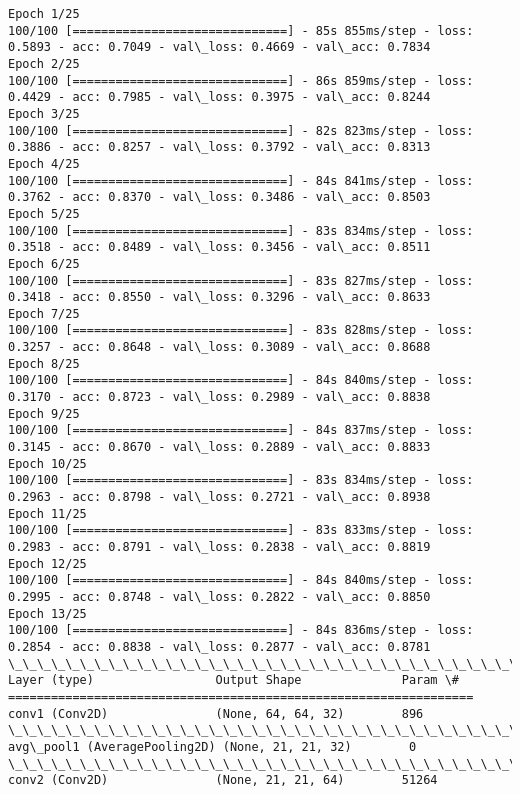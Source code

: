 \documentclass[11pt]{article}
\begin{document}
    \begin{Verbatim}[commandchars=\\\{\}]
Epoch 1/25
100/100 [==============================] - 85s 855ms/step - loss: 0.5893 - acc: 0.7049 - val\_loss: 0.4669 - val\_acc: 0.7834
Epoch 2/25
100/100 [==============================] - 86s 859ms/step - loss: 0.4429 - acc: 0.7985 - val\_loss: 0.3975 - val\_acc: 0.8244
Epoch 3/25
100/100 [==============================] - 82s 823ms/step - loss: 0.3886 - acc: 0.8257 - val\_loss: 0.3792 - val\_acc: 0.8313
Epoch 4/25
100/100 [==============================] - 84s 841ms/step - loss: 0.3762 - acc: 0.8370 - val\_loss: 0.3486 - val\_acc: 0.8503
Epoch 5/25
100/100 [==============================] - 83s 834ms/step - loss: 0.3518 - acc: 0.8489 - val\_loss: 0.3456 - val\_acc: 0.8511
Epoch 6/25
100/100 [==============================] - 83s 827ms/step - loss: 0.3418 - acc: 0.8550 - val\_loss: 0.3296 - val\_acc: 0.8633
Epoch 7/25
100/100 [==============================] - 83s 828ms/step - loss: 0.3257 - acc: 0.8648 - val\_loss: 0.3089 - val\_acc: 0.8688
Epoch 8/25
100/100 [==============================] - 84s 840ms/step - loss: 0.3170 - acc: 0.8723 - val\_loss: 0.2989 - val\_acc: 0.8838
Epoch 9/25
100/100 [==============================] - 84s 837ms/step - loss: 0.3145 - acc: 0.8670 - val\_loss: 0.2889 - val\_acc: 0.8833
Epoch 10/25
100/100 [==============================] - 83s 834ms/step - loss: 0.2963 - acc: 0.8798 - val\_loss: 0.2721 - val\_acc: 0.8938
Epoch 11/25
100/100 [==============================] - 83s 833ms/step - loss: 0.2983 - acc: 0.8791 - val\_loss: 0.2838 - val\_acc: 0.8819
Epoch 12/25
100/100 [==============================] - 84s 840ms/step - loss: 0.2995 - acc: 0.8748 - val\_loss: 0.2822 - val\_acc: 0.8850
Epoch 13/25
100/100 [==============================] - 84s 836ms/step - loss: 0.2854 - acc: 0.8838 - val\_loss: 0.2877 - val\_acc: 0.8781
\_\_\_\_\_\_\_\_\_\_\_\_\_\_\_\_\_\_\_\_\_\_\_\_\_\_\_\_\_\_\_\_\_\_\_\_\_\_\_\_\_\_\_\_\_\_\_\_\_\_\_\_\_\_\_\_\_\_\_\_\_\_\_\_\_
Layer (type)                 Output Shape              Param \#   
=================================================================
conv1 (Conv2D)               (None, 64, 64, 32)        896       
\_\_\_\_\_\_\_\_\_\_\_\_\_\_\_\_\_\_\_\_\_\_\_\_\_\_\_\_\_\_\_\_\_\_\_\_\_\_\_\_\_\_\_\_\_\_\_\_\_\_\_\_\_\_\_\_\_\_\_\_\_\_\_\_\_
avg\_pool1 (AveragePooling2D) (None, 21, 21, 32)        0         
\_\_\_\_\_\_\_\_\_\_\_\_\_\_\_\_\_\_\_\_\_\_\_\_\_\_\_\_\_\_\_\_\_\_\_\_\_\_\_\_\_\_\_\_\_\_\_\_\_\_\_\_\_\_\_\_\_\_\_\_\_\_\_\_\_
conv2 (Conv2D)               (None, 21, 21, 64)        51264     

\end{Verbatim}
\end{document}
